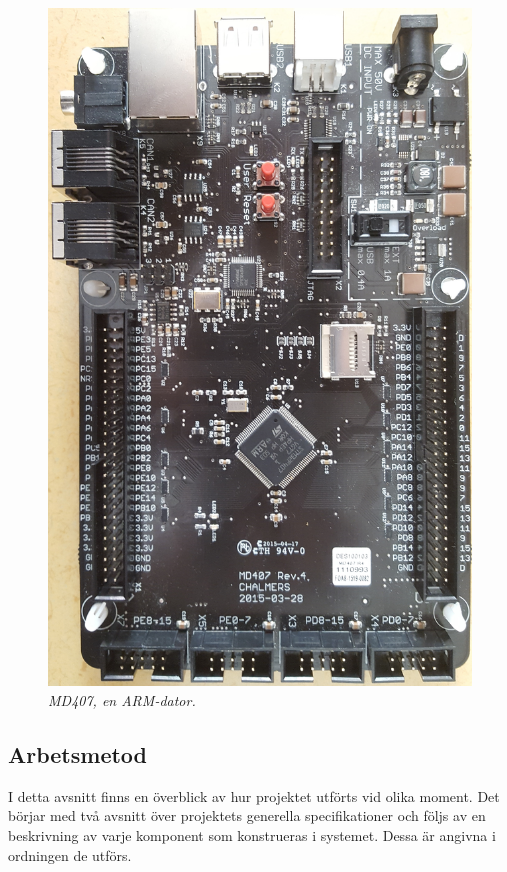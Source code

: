 \documentclass[a4paper]{article}
\begin{document}
\begin{figure}[H]
\includegraphics[scale=0.03]{MD407.jpg} \hspace{2mm}
\centering
\caption{\it MD407, en ARM-dator.}
\end{figure} 

\subsection{Arbetsmetod}
I detta avsnitt finns en överblick av hur projektet utförts vid olika moment. Det börjar med två avsnitt över projektets generella specifikationer och följs av en beskrivning av varje komponent som konstrueras i systemet. Dessa är angivna i ordningen de utförs.
\end{document}
